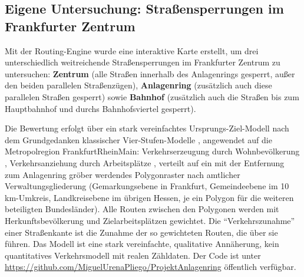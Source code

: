 \documentclass[a4paper,12pt]{article}
\begin{document}
\FloatBarrier
\subsection{Eigene Untersuchung: Straßensperrungen im Frankfurter Zentrum}

Mit der Routing-Engine wurde eine interaktive Karte erstellt, um drei unterschiedlich weitreichende Straßensperrungen im Frankfurter Zentrum zu untersuchen: \textbf{Zentrum} (alle Straßen innerhalb des Anlagenrings gesperrt, außer den beiden parallelen Straßenzügen), \textbf{Anlagenring} (zusätzlich auch diese parallelen Straßen gesperrt) sowie \textbf{Bahnhof} (zusätzlich auch die Straßen bis zum Hauptbahnhof und durchs Bahnhofsviertel gesperrt).

Die Bewertung erfolgt über ein stark vereinfachtes Ursprungs-Ziel-Modell nach dem Grundgedanken klassischer Vier-Stufen-Modelle \autocite{ortuzarwillumsen2011}, angewendet auf die Metropolregion FrankfurtRheinMain: Verkehrserzeugung durch Wohnbevölkerung \autocite{worldpop2020}, Verkehrsanziehung durch Arbeitsplätze \autocite{bundesagenturfurarbeit2025}, verteilt auf ein mit der Entfernung zum Anlagenring gröber werdendes Polygonraster nach amtlicher Verwaltungsgliederung \autocite{hvbg2026} (Gemarkungsebene in Frankfurt, Gemeindeebene im 10\,km-Umkreis, Landkreisebene im übrigen Hessen, je ein Polygon für die weiteren beteiligten Bundesländer). Alle Routen zwischen den Polygonen werden mit Herkunftsbevölkerung und Zielarbeitsplätzen gewichtet. Die \enquote{Verkehrszunahme} einer Straßenkante ist die Zunahme der so gewichteten Routen, die über sie führen. Das Modell ist eine stark vereinfachte, qualitative Annäherung, kein quantitatives Verkehrsmodell mit realen Zähldaten. Der Code ist unter \url{https://github.com/MiguelUrenaPliego/ProjektAnlagenring} öffentlich verfügbar.
\end{document}
